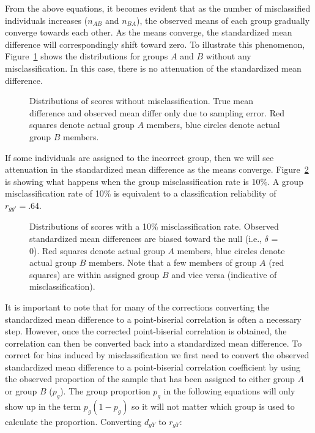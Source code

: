 \documentclass[
  letterpaper,
  DIV=11,
  numbers=noendperiod]{scrreprt}
\begin{document}
From the above equations, it becomes evident that as the number of
misclassified individuals increases (\(n_{AB}\) and \(n_{BA}\)), the
observed means of each group gradually converge towards each other. As
the means converge, the standardized mean difference will
correspondingly shift toward zero. To illustrate this phenomenon,
Figure~\ref{fig-no-mis} shows the distributions for groups \(A\) and
\(B\) without any misclassification. In this case, there is no
attenuation of the standardized mean difference.

\begin{figure}[H]


\caption{\label{fig-no-mis}Distributions of scores without
misclassification. True mean difference and observed mean differ only
due to sampling error. Red squares denote actual group \(A\) members,
blue circles denote actual group \(B\) members.}

\end{figure}%

If some individuals are assigned to the incorrect group, then we will
see attenuation in the standardized mean difference as the means
converge. Figure~\ref{fig-mis} is showing what happens when the group
misclassification rate is 10\%. A group misclassification rate of 10\%
is equivalent to a classification reliability of \(r_{gg'}=.64\).

\begin{figure}[H]


\caption{\label{fig-mis}Distributions of scores with a 10\%
misclassification rate. Observed standardized mean differences are
biased toward the null (i.e., \(\delta\) = 0). Red squares denote actual
group \(A\) members, blue circles denote actual group \(B\) members.
Note that a few members of group \(A\) (red squares) are within assigned
group \(B\) and vice versa (indicative of misclassification).}

\end{figure}%

It is important to note that for many of the corrections converting the
standardized mean difference to a point-biserial correlation is often a
necessary step. However, once the corrected point-biserial correlation
is obtained, the correlation can then be converted back into a
standardized mean difference. To correct for bias induced by
misclassification we first need to convert the observed standardized
mean difference to a point-biserial correlation coefficient by using the
observed proportion of the sample that has been assigned to either group
\(A\) or group \(B\) (\(p_g\)). The group proportion \(p_g\) in the
following equations will only show up in the term \(p_g(1-p_g)\) so it
will not matter which group is used to calculate the proportion.
Converting \(d_{gY}\) to \(r_{gY}\):
\end{document}
